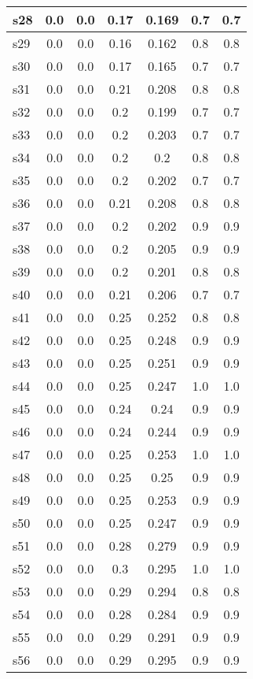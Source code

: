 \documentclass{article}
\begin{document}
\begin{tabular}{|l|c|c|c|c|c|c|}
\hline
s28 &0.0 & 0.0 & 0.17 & 0.169 & 0.7 & 0.7\\
\hline
s29 &0.0 & 0.0 & 0.16 & 0.162 & 0.8 & 0.8\\
\hline
s30 &0.0 & 0.0 & 0.17 & 0.165 & 0.7 & 0.7\\
\hline
s31 &0.0 & 0.0 & 0.21 & 0.208 & 0.8 & 0.8\\
\hline
s32 &0.0 & 0.0 & 0.2 & 0.199 & 0.7 & 0.7\\
\hline
s33 &0.0 & 0.0 & 0.2 & 0.203 & 0.7 & 0.7\\
\hline
s34 &0.0 & 0.0 & 0.2 & 0.2 & 0.8 & 0.8\\
\hline
s35 &0.0 & 0.0 & 0.2 & 0.202 & 0.7 & 0.7\\
\hline
s36 &0.0 & 0.0 & 0.21 & 0.208 & 0.8 & 0.8\\
\hline
s37 &0.0 & 0.0 & 0.2 & 0.202 & 0.9 & 0.9\\
\hline
s38 &0.0 & 0.0 & 0.2 & 0.205 & 0.9 & 0.9\\
\hline
s39 &0.0 & 0.0 & 0.2 & 0.201 & 0.8 & 0.8\\
\hline
s40 &0.0 & 0.0 & 0.21 & 0.206 & 0.7 & 0.7\\
\hline
s41 &0.0 & 0.0 & 0.25 & 0.252 & 0.8 & 0.8\\
\hline
s42 &0.0 & 0.0 & 0.25 & 0.248 & 0.9 & 0.9\\
\hline
s43 &0.0 & 0.0 & 0.25 & 0.251 & 0.9 & 0.9\\
\hline
s44 &0.0 & 0.0 & 0.25 & 0.247 & 1.0 & 1.0\\
\hline
s45 &0.0 & 0.0 & 0.24 & 0.24 & 0.9 & 0.9\\
\hline
s46 &0.0 & 0.0 & 0.24 & 0.244 & 0.9 & 0.9\\
\hline
s47 &0.0 & 0.0 & 0.25 & 0.253 & 1.0 & 1.0\\
\hline
s48 &0.0 & 0.0 & 0.25 & 0.25 & 0.9 & 0.9\\
\hline
s49 &0.0 & 0.0 & 0.25 & 0.253 & 0.9 & 0.9\\
\hline
s50 &0.0 & 0.0 & 0.25 & 0.247 & 0.9 & 0.9\\
\hline
s51 &0.0 & 0.0 & 0.28 & 0.279 & 0.9 & 0.9\\
\hline
s52 &0.0 & 0.0 & 0.3 & 0.295 & 1.0 & 1.0\\
\hline
s53 &0.0 & 0.0 & 0.29 & 0.294 & 0.8 & 0.8\\
\hline
s54 &0.0 & 0.0 & 0.28 & 0.284 & 0.9 & 0.9\\
\hline
s55 &0.0 & 0.0 & 0.29 & 0.291 & 0.9 & 0.9\\
\hline
s56 &0.0 & 0.0 & 0.29 & 0.295 & 0.9 & 0.9\\

\end{tabular}
\end{document}
